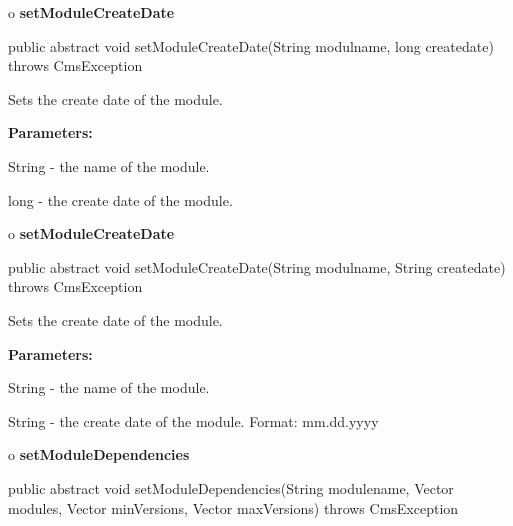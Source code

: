 o {\bf setModuleCreateDate} 

\begin{PRE}
 public abstract void setModuleCreateDate(String modulname,
                                          long createdate) throws CmsException
\end{PRE}

\begin{description}
\htmlDD Sets the create date of the module. 

\begin{description}
\item {\bf Parameters:}  

String - the name of the module.  

long - the create date of the module.  
\end{description}

\end{description}

o {\bf setModuleCreateDate} 

\begin{PRE}
 public abstract void setModuleCreateDate(String modulname,
                                          String createdate) throws CmsException
\end{PRE}

\begin{description}
\htmlDD Sets the create date of the module. 

\begin{description}
\item {\bf Parameters:}  

String - the name of the module.  

String - the create date of the module. Format: mm.dd.yyyy  
\end{description}

\end{description}

o {\bf setModuleDependencies} 

\begin{PRE}
 public abstract void setModuleDependencies(String modulename,
                                            Vector modules,
                                            Vector minVersions,
                                            Vector maxVersions) throws CmsException
\end{PRE}

